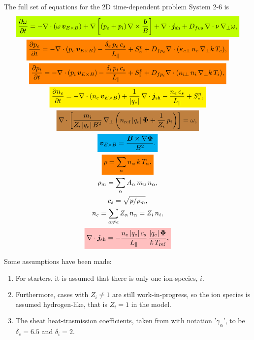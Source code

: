 \documentclass[12pt]{article}
\newcommand{\mathcolorbox}[2]{\colorbox{#1}{$\displaystyle #2$}}
\begin{document}
The full set of equations for the 2D time-dependent problem System 2-6 \cite[§8]{Arter_Equations_2023} is
%
\begin{gather}
    \mathcolorbox{lime}{ \frac{\partial\omega}{\partial t} = - \nabla \cdot (\omega \, \bm{v}_{E \times B}) + \nabla \left[ (p_e + p_i) \, \nabla \times \frac{\bm{b}}{B} \right] + \nabla \cdot \bm{j}_\text{sh} + D_{fvs} \, \nabla \cdot \nu \, \nabla_\perp \omega , } \\
    \mathcolorbox{orange}{ \frac{\partial p_e}{\partial t} = - \nabla \cdot (p_e \, \bm{v}_{E \times B}) - \frac{\delta_e \, p_e \, c_s}{L_\parallel} + S_e^p + D_{fp_e} \nabla \cdot (\kappa_{e\perp} \, n_e \, \nabla_\perp k \, T_e) , } \\
    \mathcolorbox{orange}{ \frac{\partial p_i}{\partial t} = - \nabla \cdot (p_i \, \bm{v}_{E \times B}) - \frac{\delta_i \, p_i \, c_s}{L_\parallel} + S_i^p + D_{fp_i} \nabla \cdot (\kappa_{i\perp} \, n_i \, \nabla_\perp k \, T_i) , } \\
    \mathcolorbox{yellow}{ \frac{\partial n_e}{\partial t} = - \nabla \cdot (n_e \, \bm{v}_{E \times B}) + \frac{1}{|q_e|} \, \nabla \cdot \bm{j}_\text{sh} - \frac{n_e \, c_s}{L_\parallel} + S_e^n , } \\
    \mathcolorbox{brown}{ \nabla \cdot \left[ \frac{m_i}{Z_i \, |q_e| \, B^2} \, \nabla_\perp \left( n_\text{ref} \, |q_e| \, \bm{\Phi} + \frac{1}{Z_i} \, p_i \right) \right] = \omega , } \\
    \mathcolorbox{cyan}{ \bm{v}_{E \times B} = \frac{\bm{B} \times \nabla \bm{\Phi}}{B^2} . } \\
    \mathcolorbox{orange}{ p = \sum_\alpha n_\alpha \, k \, T_\alpha , } \\
    \rho_m = \sum_\alpha A_\alpha \, m_u \, n_\alpha , \\
    c_s = \sqrt{p / \rho_m} , \\
    n_e = \sum_{\alpha \ne e} Z_\alpha \, n_\alpha = Z_i \, n_i , \\
    \mathcolorbox{pink}{ \nabla \cdot \bm{j}_\text{sh} = - \frac{n_e \, |q_e| \, c_s}{L_\parallel} \, \frac{|q_e| \, \bm{\Phi}}{k \, T_\text{ref}} , } \\
\end{gather}

Some assumptions have been made:
%
\begin{enumerate}
    \item For starters, it is assumed that there is only one ion-species, $i$.
    \item Furthermore, cases with $Z_i \ne 1$ are still work-in-progress, so the ion species is assumed hydrogen-like, that is $Z_i = 1$ in the model.
    \item The sheat heat-trasmission coefficients, taken from \cite[§2.8]{Stangeby_Plasma_2000} with notation '$\gamma_\alpha$', to be $\delta_e = 6.5$ and $\delta_i = 2$.
\end{enumerate}
\end{document}
